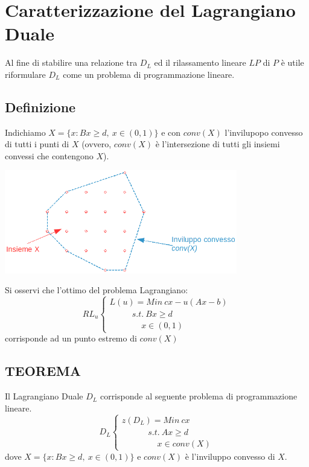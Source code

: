 \section{Caratterizzazione del Lagrangiano Duale}
Al fine di stabilire una relazione tra $D_{L}$ ed il rilassamento lineare $LP$ di $P$ è utile riformulare $D_{L}$ come un problema di programmazione lineare.
\subsection{Definizione}
Indichiamo $X=\{x: Bx\ge d,\ x\in(0,1) \}$ e con $conv(X)$ l'invilupopo convesso di tutti i punti di $X$ (ovvero, $conv(X)$ è l'intersezione di tutti gli insiemi convessi che contengono $X$).
\centerline{\includegraphics[height=4.5cm]{images/graph27.png}}
Si osservi che l'ottimo del problema Lagrangiano:
\begin{displaymath}
	RL_{u}
	\begin{cases}
		L(u)=Min\ cx-u(Ax-b) \\
		\ \ \ \ \ \ \ \ \ \ \ \ s.t.\ Bx\ge d \\
		\ \ \ \ \ \ \ \ \ \ \ \ \ \ \ \ \ x\in (0,1)
	\end{cases}
\end{displaymath}
corrisponde ad un punto estremo di $conv(X)$
\clearpage
\subsection{TEOREMA}
Il Lagrangiano Duale $D_{L}$ corrisponde al seguente problema di programmazione lineare.
\begin{displaymath}
D_{L}
\begin{cases}
z(D_{L})=Min\ cx \\
\ \ \ \ \ \ \ \ \ \ \ \ \ \ s.t.\ Ax\ge d \\
\ \ \ \ \ \ \ \ \ \ \ \ \ \ \ \ \ \ \ x\in conv(X)
\end{cases}
\end{displaymath}
dove $X=\{x:Bx\ge d,\ x\in(0,1)\}$ e $conv(X)$ è l'inviluppo convesso di $X$.

